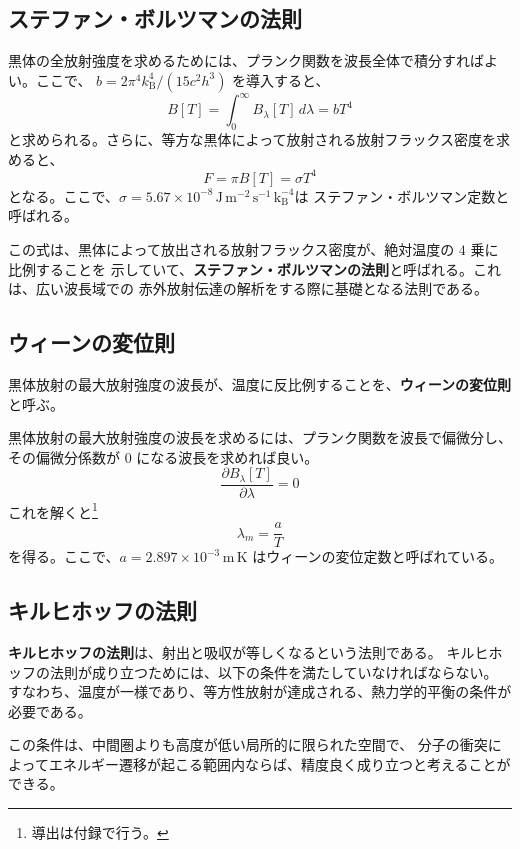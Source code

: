 \documentclass[book]{dennou777}
\newcommand{\hmunit}[1]{\,\mathrm{#1}}
\newcommand{\hmemph}[1]{\textbf{#1}}
\begin{document}
\subsection{ステファン・ボルツマンの法則}
黒体の全放射強度を求めるためには、プランク関数を波長全体で積分すればよい。ここで、
$b=2\pi^4k_\mathrm{B}^4/(15c^2h^3)$ を導入すると、
\begin{equation}
	B[T]=\int^\infty_0 B_\lambda[T]\,d\lambda=bT^4
\end{equation}
と求められる。さらに、等方な黒体によって放射される放射フラックス密度を求めると、
\begin{equation}
	F=\pi B[T]=\sigma T^4
\end{equation}
となる。ここで、$\sigma=5.67\times10^{-8}\hmunit{J\,m^{-2}\,s^{-1}\,k_\mathrm{B}^{-4}}$は
ステファン・ボルツマン定数と呼ばれる。

この式は、黒体によって放出される放射フラックス密度が、絶対温度の $4$ 乗に比例することを
示していて、\hmemph{ステファン・ボルツマンの法則}と呼ばれる。これは、広い波長域での
赤外放射伝達の解析をする際に基礎となる法則である。

\subsection{ウィーンの変位則}
黒体放射の最大放射強度の波長が、温度に反比例することを、\hmemph{ウィーンの変位則}と呼ぶ。

黒体放射の最大放射強度の波長を求めるには、プランク関数を波長で偏微分し、その偏微分係数が
$0$ になる波長を求めれば良い。
\begin{equation}
	\frac{\partial B_\lambda[T]}{\partial\lambda}=0
\end{equation}
これを解くと\footnote{導出は付録で行う。}
\begin{equation}
	\lambda_m=\frac{a}{T}
\end{equation}
を得る。ここで、$a=2.897\times10^{-3}\hmunit{m\,K}$ はウィーンの変位定数と呼ばれている。

\subsection{キルヒホッフの法則}
\hmemph{キルヒホッフの法則}は、射出と吸収が等しくなるという法則である。
キルヒホッフの法則が成り立つためには、以下の条件を満たしていなければならない。
すなわち、温度が一様であり、等方性放射が達成される、熱力学的平衡の条件が必要である。

この条件は、中間圏よりも高度が低い局所的に限られた空間で、
分子の衝突によってエネルギー遷移が起こる範囲内ならば、精度良く成り立つと考えることができる。
\end{document}
